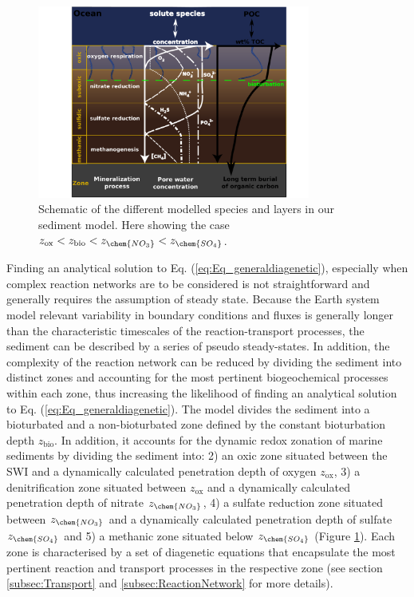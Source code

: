 \documentclass[gmd, manuscript]{copernicus}
\begin{document}
\begin{figure}[htbp]
\begin{center}
	\includegraphics[width=0.8\textwidth]{figures/Sediment-model-with-profiles-rotated90.pdf}
	\caption{Schematic of the different modelled species and layers in our sediment model. Here showing the case $z_{\mathrm{ox}} < z_{\mathrm{bio}} < z_{\chem{NO_3}} < z_{\chem{SO_4}}$.}
	\label{fig:Sediment_layers}
	\end{center}
\end{figure}

Finding an analytical solution to  Eq. (\ref{eq:Eq_generaldiagenetic}), especially when complex reaction networks are to be considered is not straightforward and generally requires the assumption of steady state. 
Because the Earth system model relevant variability in boundary conditions and fluxes is generally longer than the characteristic timescales of the reaction-transport processes, the sediment can be described by a 
series of pseudo steady-states. In addition, the complexity of the reaction network can be reduced by dividing the sediment into distinct zones and accounting for the most pertinent biogeochemical processes 
within each zone, thus increasing the likelihood of finding an analytical solution to Eq. (\ref{eq:Eq_generaldiagenetic}). The model divides the sediment into a bioturbated and a non-bioturbated zone 
defined by the constant bioturbation depth $z_{\mathrm{bio}}$. In addition, it accounts for the dynamic redox zonation of marine sediments by dividing the sediment into: 2) an oxic zone situated between the 
SWI and a dynamically calculated penetration depth of oxygen $z_{\mathrm{ox}}$, 3) a denitrification zone situated between $z_{\mathrm{ox}}$ and a dynamically calculated penetration depth of nitrate $z_{\chem{NO_3}}$, 4) 
a sulfate reduction zone situated between $z_{\chem{NO_3}}$ and a dynamically calculated penetration depth of sulfate $z_{\chem{SO_4}}$ and 5) a methanic zone situated below $z_{\chem{SO_4}}$ (Figure \ref{fig:Sediment_layers}). 
Each zone is characterised by a set of diagenetic equations that encapsulate the most pertinent reaction and transport processes in the respective zone (see section \ref{subsec:Transport} and \ref{subsec:ReactionNetwork} 
for more details). 
\end{document}

